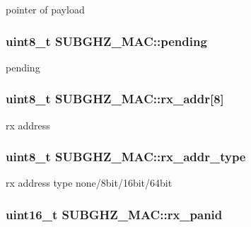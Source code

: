 pointer of payload \hypertarget{structSUBGHZ__MAC_ae5fb71523abf317402fd145eccc6b0d2}{
\subsubsection[{pending}]{\setlength{\rightskip}{0pt plus 5cm}uint8\+\_\+t S\+U\+B\+G\+H\+Z\+\_\+\+M\+A\+C\+::pending}}\label{structSUBGHZ__MAC_ae5fb71523abf317402fd145eccc6b0d2}
pending \hypertarget{structSUBGHZ__MAC_a91947f3cbf0a86565dc59c51847f8e1c}{
\subsubsection[{rx\+\_\+addr}]{\setlength{\rightskip}{0pt plus 5cm}uint8\+\_\+t S\+U\+B\+G\+H\+Z\+\_\+\+M\+A\+C\+::rx\+\_\+addr\mbox{[}8\mbox{]}}}\label{structSUBGHZ__MAC_a91947f3cbf0a86565dc59c51847f8e1c}
rx address \hypertarget{structSUBGHZ__MAC_a06cf9d7509c07621b84aede7e96d4f97}{
\subsubsection[{rx\+\_\+addr\+\_\+type}]{\setlength{\rightskip}{0pt plus 5cm}uint8\+\_\+t S\+U\+B\+G\+H\+Z\+\_\+\+M\+A\+C\+::rx\+\_\+addr\+\_\+type}}\label{structSUBGHZ__MAC_a06cf9d7509c07621b84aede7e96d4f97}
rx address type none/8bit/16bit/64bit \hypertarget{structSUBGHZ__MAC_ada4ca30b88f0c0058a74f3ebd0c27816}{
\subsubsection[{rx\+\_\+panid}]{\setlength{\rightskip}{0pt plus 5cm}uint16\+\_\+t S\+U\+B\+G\+H\+Z\+\_\+\+M\+A\+C\+::rx\+\_\+panid}}\label{structSUBGHZ__MAC_ada4ca30b88f0c0058a74f3ebd0c27816}
